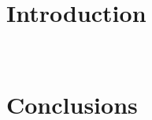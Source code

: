 \documentclass[oneside]{thesisclass}
\begin{document}

\frontmatter
{}



\tableofcontents


\mainmatter
{}
\chapter{Introduction}
~\cite{Krumke2009a}

\chapter{Conclusions}




\end{document}
